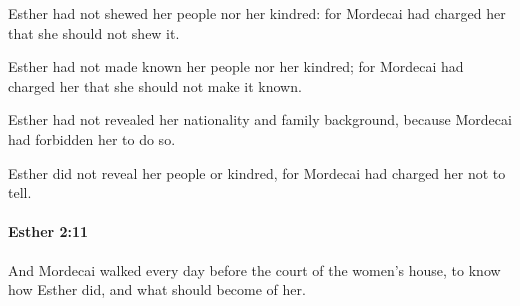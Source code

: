 			Esther had not shewed her people nor her kindred: for Mordecai had charged her that she should not shew it.

			\begin{versebox}
					\item[BHS] 
					\item[LXX] 
					\item[ASV] Esther had not made known her people nor her kindred; for Mordecai had charged her that she should not make it known.
					\item[NIV] Esther had not revealed her nationality and family background, because Mordecai had forbidden her to do so.
					\item[NRSV] Esther did not reveal her people or kindred, for Mordecai had charged her not to tell.
			\end{versebox}

		\paragraph{Esther 2:11} %
			\label{ESTHER-2-11}

			And Mordecai walked every day before the court of the women’s house, to know how Esther did, and what should become of her.

